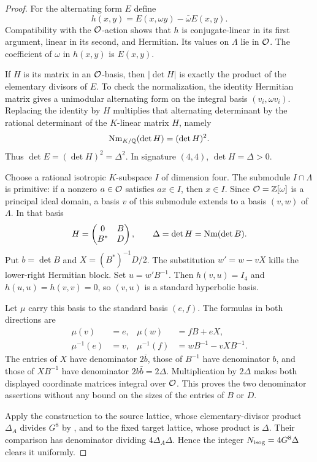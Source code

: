 \begin{proof}
For the alternating form $E$ define
\begin{equation}\label{eq:SQ-integralHermitian}
 h(x,y)=E(x,\omega y)-\bar\omega E(x,y).
\end{equation}
Compatibility with the $\mathcal O$-action shows that $h$ is conjugate-linear in its first argument, linear in its second, and Hermitian. Its values on $\Lambda$ lie in $\mathcal O$. The coefficient of $\omega$ in $h(x,y)$ is $E(x,y)$.

If $H$ is its matrix in an $\mathcal O$-basis, then $|\det H|$ is exactly the product of the elementary divisors of $E$. To check the normalization, the identity Hermitian matrix gives a unimodular alternating form on the integral basis $(v_i,\omega v_i)$. Replacing the identity by $H$ multiplies that alternating determinant by the rational determinant of the $K$-linear matrix $H$, namely
\[
 \operatorname{Nm}_{K/\mathbb Q}(\det H)=(\det H)^2.
\]
Thus $\det E=(\det H)^2=\Delta^2$. In signature $(4,4)$, $\det H=\Delta>0$.

Choose a rational isotropic $K$-subspace $I$ of dimension four. The submodule $I\cap\Lambda$ is primitive: if a nonzero $a\in\mathcal O$ satisfies $ax\in I$, then $x\in I$. Since $\mathcal O=\mathbb Z[\omega]$ is a principal ideal domain, a basis $v$ of this submodule extends to a basis $(v,w)$ of $\Lambda$. In that basis
\[
 H=\begin{pmatrix}0&B\\B^*&D\end{pmatrix},
 \qquad \Delta=\det H=\operatorname{Nm}(\det B).
\]
Put $b=\det B$ and $X=(B^*)^{-1}D/2$. The substitution $w'=w-vX$ kills the lower-right Hermitian block. Set $u=w'B^{-1}$. Then $h(v,u)=I_4$ and $h(u,u)=h(v,v)=0$, so $(v,u)$ is a standard hyperbolic basis.

Let $\mu$ carry this basis to the standard basis $(e,f)$. The formulas in both directions are
\begin{align*}
 \mu(v)&=e,& \mu(w)&=fB+eX,\\
 \mu^{-1}(e)&=v,& \mu^{-1}(f)&=wB^{-1}-vXB^{-1}.
\end{align*}
The entries of $X$ have denominator $2\bar b$, those of $B^{-1}$ have denominator $b$, and those of $XB^{-1}$ have denominator $2b\bar b=2\Delta$. Multiplication by $2\Delta$ makes both displayed coordinate matrices integral over $\mathcal O$. This proves the two denominator assertions without any bound on the sizes of the entries of $B$ or $D$.

Apply the construction to the source lattice, whose elementary-divisor product $\Delta_A$ divides $G^8$ by , and to the fixed target lattice, whose product is $\Delta$. Their comparison has denominator dividing $4\Delta_A\Delta$. Hence the integer $N_{\rm isog}=4G^8\Delta$ clears it uniformly.


\end{proof}
